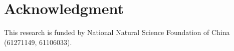 \documentclass[conference]{IEEEtran}
\begin{document}
\section*{Acknowledgment}

This research is funded by National Natural Science Foundation of China (61271149, 61106033).



%
%
%






\end{document}
